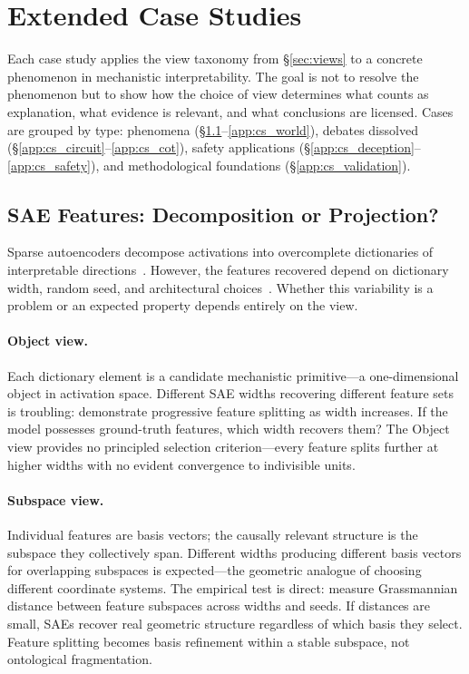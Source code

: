 \documentclass{article}
\begin{document}
\section{Extended Case Studies}\label{app:case_studies}

Each case study applies the view taxonomy from \S\ref{sec:views} to a
concrete phenomenon in mechanistic interpretability. The goal is not to
resolve the phenomenon but to show how the choice of view determines what
counts as explanation, what evidence is relevant, and what conclusions
are licensed. Cases are grouped by type: phenomena
(\S\ref{app:cs_sae}--\ref{app:cs_world}), debates dissolved
(\S\ref{app:cs_circuit}--\ref{app:cs_cot}), safety applications
(\S\ref{app:cs_deception}--\ref{app:cs_safety}), and methodological
foundations (\S\ref{app:cs_validation}).


\subsection{SAE Features: Decomposition or Projection?}\label{app:cs_sae}

Sparse autoencoders decompose activations into overcomplete dictionaries
of interpretable directions~\citep{bricken2023}. However, the features
recovered depend on dictionary width, random seed, and architectural
choices~\citep{leask2025}. Whether this variability is a problem or an
expected property depends entirely on the view.

\paragraph{Object view.}
Each dictionary element is a candidate mechanistic primitive---a
one-dimensional object in activation space. Different SAE widths
recovering different feature sets is troubling: \citet{bricken2023}
demonstrate progressive feature splitting as width increases. If the
model possesses ground-truth features, which width recovers them? The
Object view provides no principled selection criterion---every feature
splits further at higher widths with no evident convergence to
indivisible units.

\paragraph{Subspace view.}
Individual features are basis vectors; the causally relevant structure is
the subspace they collectively span. Different widths producing different
basis vectors for overlapping subspaces is expected---the geometric
analogue of choosing different coordinate systems. The empirical test is
direct: measure Grassmannian distance between feature subspaces across
widths and seeds. If distances are small, SAEs recover real geometric
structure regardless of which basis they select. Feature splitting
becomes basis refinement within a stable subspace, not ontological
fragmentation.
\end{document}

